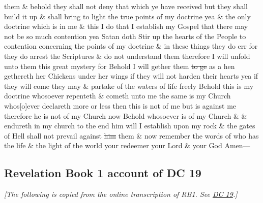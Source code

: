 them \& behold they shall not deny that which ye have received but they shall build it up \& shall bring to light the true points of my doctrine yea \& the only doctrine which is in me \& this I do that I establish my Gospel that there may not be so much contention yea Satan doth Stir up the hearts of the People to contention concerning the points of my doctrine \& in these things they do err for they do arrest the Scriptures \& do not understand them therefore I will unfold unto them this great mystery for Behold I will gether them \sout{to ge} as a hen gethereth her Chickens under her wings if they will not harden their hearts yea if they will come they may \& partake of the waters of life freely Behold this is my doctrine whosoever repenteth \& cometh unto me the same is my Church whos[o]ever declareth more or less then this is not of me but is against me therefore he is not of my Church now Behold whosoever is of my Church \& \sout{\&} endureth in my church to the end him will I establish upon my rock \& the gates of Hell shall not prevail against \sout{him} them \& now remember the words of who has the life \& the light of the world your redeemer your Lord \& your God Amen---
		
	\subsection{Revelation Book 1 account of DC 19}
		\label{EXSS-DC19-RB1}
		
		\textit{[The following is copied from the online transcription of RB1. See \hyperref[DC19]{DC 19}.]}
		
